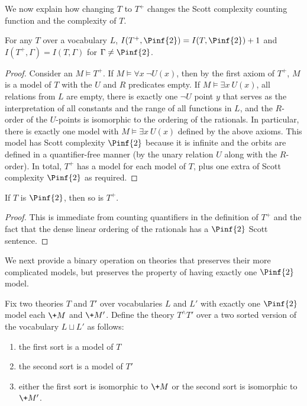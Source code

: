\documentclass[10pt,a4paper]{amsart}
\renewcommand{\-}{\text{-}}
\begin{document}
We now explain how changing $T$ to $T^+$ changes the Scott complexity counting function and the complexity of $T$.

\begin{lemma}
For any $T$ over a vocabulary $L$, $I(T^+,\Pinf{2})=I(T,\Pinf{2})+1$ and $I(T^+,\Gamma)=I(T,\Gamma)$ for $\Gamma\neq \Pinf{2}$.
\end{lemma}

\begin{proof}
Consider an $M\models T^+$. 
If $M\models \forall x\ \lnot U(x)$, then by the first axiom of $T^+$, $M$ is a model of $T$ with the $U$ and $R$ predicates empty.
If $M\models \exists x\ U(x)$, all relations from $L$ are empty, there is exactly one $\lnot U$ point $y$ that serves as the interpretation of all constants and the range of all functions in $L$, and the $R$-order of the $U$-points is isomorphic to the ordering of the rationals.
In particular, there is exactly one model with $M\models \exists x\ U(x)$ defined by the above axioms.
This model has Scott complexity $\Pinf{2}$ because it is infinite and the orbits are defined in a quantifier-free manner (by the unary relation $U$ along with the $R$-order).
In total, $T^+$ has a model for each model of $T$, plus one extra of Scott complexity $\Pinf{2}$ as required.
\end{proof}

\begin{lemma}
If $T$ is $\Pinf{2}$, then so is $T^+$.
\end{lemma}

\begin{proof}
This is immediate from counting quantifiers in the definition of $T^+$ and the fact that the dense linear ordering of the rationals has a $\Pinf{2}$ Scott sentence.
\end{proof}

We next provide a binary operation on theories that preserves their more complicated models, but preserves the property of having exactly one $\Pinf{2}$ model.

\begin{definition}
Fix two theories $T$ and $T'$ over vocabularies $L$ and $L'$ with exactly one $\Pinf{2}$ model each $\+M$ and $\+M'$.
Define the theory $T^\wedge T'$ over a two sorted version of the vocabulary $L\sqcup L'$ as follows:
\begin{enumerate}
	\item the first sort is a model of $T$
	\item the second sort is a model of $T'$
	\item either the first sort is isomorphic to $\+M$ or the second sort is isomorphic to $\+M'$.
\end{enumerate}
\end{definition}
\end{document}
